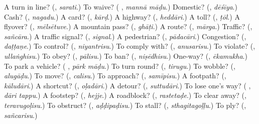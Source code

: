 \begin{tcolorbox}[breakable,colback=teal!4,colframe=teal!35!black,title={Before you move on}]
A turn in line? (\textbf{}, \emph{sarati}.) To waive? (\textbf{ }, \emph{mannā māḍu}.) Domestic? (\textbf{}, \emph{dēśīya}.) Cash? (\textbf{}, \emph{nagadu}.) A card? (\textbf{}, \emph{kārḍ}.) A highway? (\textbf{}, \emph{heddāri}.) A toll? (\textbf{}, \emph{ṭōl}.) A flyover? (\textbf{}, \emph{mēlsētuve}.) A mountain pass? (\textbf{}, \emph{ghāṭi}.) A route? (\textbf{}, \emph{mārga}.) Traffic? (\textbf{}, \emph{sañcāra}.) A traffic signal? (\textbf{}, \emph{signal}.) A pedestrian? (\textbf{}, \emph{pādacāri}.) Congestion? (\textbf{}, \emph{daṭṭaṇe}.) To control? (\textbf{}, \emph{niyantrisu}.) To comply with? (\textbf{}, \emph{anusarisu}.) To violate? (\textbf{}, \emph{ullaṅghisu}.) To obey? (\textbf{}, \emph{pālisu}.) To ban? (\textbf{}, \emph{niṣēdhisu}.) One-way? (\textbf{}, \emph{ēkamukha}.) To park a vehicle? (\textbf{ }, \emph{pārk māḍu}.) To turn round? (\textbf{}, \emph{tirugu}.) To wobble? (\textbf{}, \emph{alugāḍu}.) To move? (\textbf{}, \emph{calisu}.) To approach? (\textbf{}, \emph{samīpisu}.) A footpath? (\textbf{}, \emph{kāludāri}.) A shortcut? (\textbf{}, \emph{oḷadāri}.) A detour? (\textbf{}, \emph{suttudāri}.) To lose one's way? (\textbf{ }, \emph{dāri tappu}.) A footstep? (\textbf{}, \emph{hejje}.) A roadblock? (\textbf{}, \emph{rastetaḍe}.) To clear away? (\textbf{}, \emph{teravugoḷisu}.) To obstruct? (\textbf{}, \emph{aḍḍipaḍisu}.) To stall? (\textbf{}, \emph{sthagitagoḷḷu}.) To ply? (\textbf{}, \emph{sañcarisu}.)
\end{tcolorbox}
